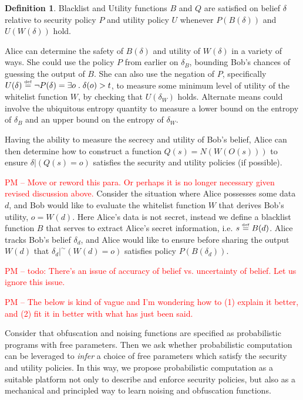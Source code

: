 \documentclass{article} %
\newcommand{\pxm}[1]{\textcolor{red}{PM -- #1}}
\newcommand{\rsecret}[0]{s}
\newcommand{\paren}[1]{\left( #1 \right)}
\newcommand{\cond}[0]{|}
\newcommand{\qsep}[0]{\; . \;}
\newcommand{\stacklabel}[1]{\stackrel{\smash{\scriptscriptstyle \mathrm{#1}}}}
\newcommand{\defeq}{\stacklabel{def}=}
\theoremstyle{plain} %
\theoremstyle{definition} %
\newtheorem*{definition-un}{Definition}
\begin{document}
\begin{definition-un} Blacklist and Utility functions $ B $ and $ Q $
  are satisfied on belief $ \delta $ relative to security policy $ P $
  and utility policy $ U $ whenever $P(B(\delta))$ and $U(W(\delta))$ hold.
\end{definition-un}

Alice can determine the safety of $ B(\delta) $ and utility of $
W(\delta) $ in a variety of ways. She could use the policy $ P $ from
earlier on $ \delta_B $, bounding Bob's chances of guessing the output
of $ B $. She can also use the negation of $ P $, specifically $
U(\delta) \defeq \neg P(\delta) = \exists o \qsep \delta(o) > t $, to
measure some minimum level of utility of the whitelist function $ W $,
by checking that $ U(\delta_W) $ holds. Alternate means could involve
the ubiquitous entropy quantity to measure a lower bound on the
entropy of $ \delta_B $ and an upper bound on the entropy of $
\delta_W $.


Having the ability to measure the secrecy and utility of Bob's belief,
Alice can then determine how to construct a function $ Q(s) =
N(W(O(s))) $ to ensure $ \delta \cond \paren{Q(\rsecret) = o} $
satisfies the security and utility policies (if possible).

\pxm{Move or reword this para. Or perhaps it is no longer necessary
  given revised discussion above.} Consider the situation where Alice
possesses some data $ d $, and Bob would like to evaluate the
whitelist function $ W $ that derives Bob's utility, $ o = W(d)
$. Here Alice's data is not secret, instead we define a blacklist
function $ B $ that serves to extract Alice's secret information,
i.e. $ s \defeq B(d) $. Alice tracks Bob's belief $ \delta_d $, and
Alice would like to ensure before sharing the output $ W(d) $ that
$\delta_d |^\sim (W(d) = o)$ satisfies policy $ P(B(\delta_d)) $.

\pxm{todo: There's an issue of accuracy of belief vs. uncertainty of
  belief. Let us ignore this issue.}

\pxm{The below is kind of vague and I'm wondering how to (1) explain
  it better, and (2) fit it in better with what has just been said.}

Consider that obfuscation and noising functions are specified as
probabilistic programs with free parameters. Then we ask whether
probabilistic computation can be leveraged to \emph{infer} a choice of
free parameters which satisfy the security and utility policies.  In
this way, we propose probabilistic computation as a suitable platform
not only to describe and enforce security policies, but also as a
mechanical and principled way to learn noising and obfuscation
functions.
 
\end{document}
